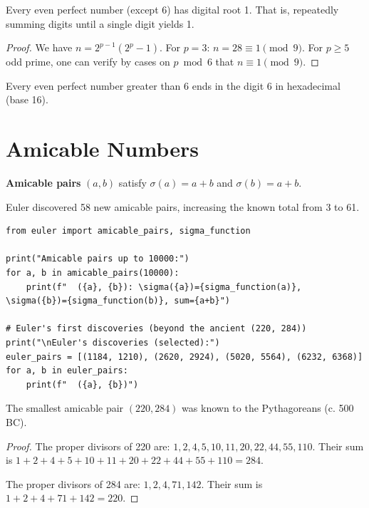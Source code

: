 \begin{theorem}
Every even perfect number (except 6) has digital root 1. That is, repeatedly summing digits until a single digit yields 1.
\end{theorem}

\begin{proof}
We have $n = 2^{p-1}(2^p - 1)$. For $p = 3$: $n = 28 \equiv 1 \pmod{9}$. For $p \geq 5$ odd prime, one can verify by cases on $p \bmod 6$ that $n \equiv 1 \pmod{9}$.
\end{proof}

\begin{theorem}
Every even perfect number greater than 6 ends in the digit 6 in hexadecimal (base 16).
\end{theorem}

\section{Amicable Numbers}

\textbf{Amicable pairs} $(a,b)$ satisfy $\sigma(a) = a+b$ and $\sigma(b) = a+b$.

Euler discovered 58 new amicable pairs, increasing the known total from 3 to 61.

\begin{lstlisting}[caption={Finding amicable pairs}, label=lst:amicable]
from euler import amicable_pairs, sigma_function

print("Amicable pairs up to 10000:")
for a, b in amicable_pairs(10000):
    print(f"  ({a}, {b}): \sigma({a})={sigma_function(a)}, \sigma({b})={sigma_function(b)}, sum={a+b}")

# Euler's first discoveries (beyond the ancient (220, 284))
print("\nEuler's discoveries (selected):")
euler_pairs = [(1184, 1210), (2620, 2924), (5020, 5564), (6232, 6368)]
for a, b in euler_pairs:
    print(f"  ({a}, {b})")
\end{lstlisting}

\begin{theorem}
The smallest amicable pair $(220, 284)$ was known to the Pythagoreans (c. 500 BC).
\end{theorem}

\begin{proof}
The proper divisors of 220 are: $1, 2, 4, 5, 10, 11, 20, 22, 44, 55, 110$. Their sum is $1+2+4+5+10+11+20+22+44+55+110 = 284$.

The proper divisors of 284 are: $1, 2, 4, 71, 142$. Their sum is $1+2+4+71+142 = 220$.
\end{proof}

